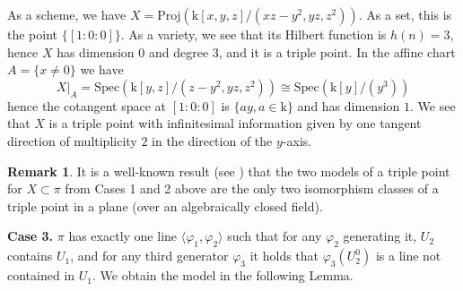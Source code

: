 \documentclass[10pt,reqno]{amsart}
\renewcommand{\a}{\alpha}
\renewcommand{\b}{\beta}
\newcommand{\g}{\gamma}
\newcommand{\f}{\varphi}
\newcommand{\kk}{\mathrm{k}}
\theoremstyle{definition}
\newtheorem{remark}[theorem]{Remark}
\begin{document}
\noindent As a scheme, we have $X=\mathrm{Proj}(\kk[x,y,z]/(xz-y^2,yz,z^2))$. As a set, this is the point $\{[1:0:0]\}$. As a variety, we see that its Hilbert function is $h(n)=3$, hence $X$ has dimension $0$ and degree $3$, and it is a triple point. In the affine chart $A=\{x \ne 0\}$ we have 
\[
X|_A=\mathrm{Spec}\left(\kk[y,z]/(z-y^2,yz,z^2)\right) \cong \mathrm{Spec}\left(\kk[y]/(y^3)\right)
\]
hence the cotangent space at $[1:0:0]$ is $\{a y, a \in \kk\}$ and has dimension $1$. We see that $X$ is a triple point with infinitesimal information given by one tangent direction of multiplicity $2$ in the direction of the $y$-axis.








\begin{remark}
It is a well-known result (see \cite[II.3.2]{Eisenbud-Harris}) that the two models of a triple point for $X \subset \pi$ from Cases 1 and 2 above are the only two isomorphism classes of a triple point in a plane (over an algebraically closed field).

\end{remark}


\noindent \textbf{Case 3.} $\pi$ has exactly one line $\langle \f_1, \f_2\rangle$ such that for any $\f_2$ generating it, $U_2$ contains $U_1$, and 
for any third generator $\f_3$ it holds that $\f_3(U_2^0)$ is a line not contained in $U_1$. We obtain the model in the following Lemma.
\end{document}

